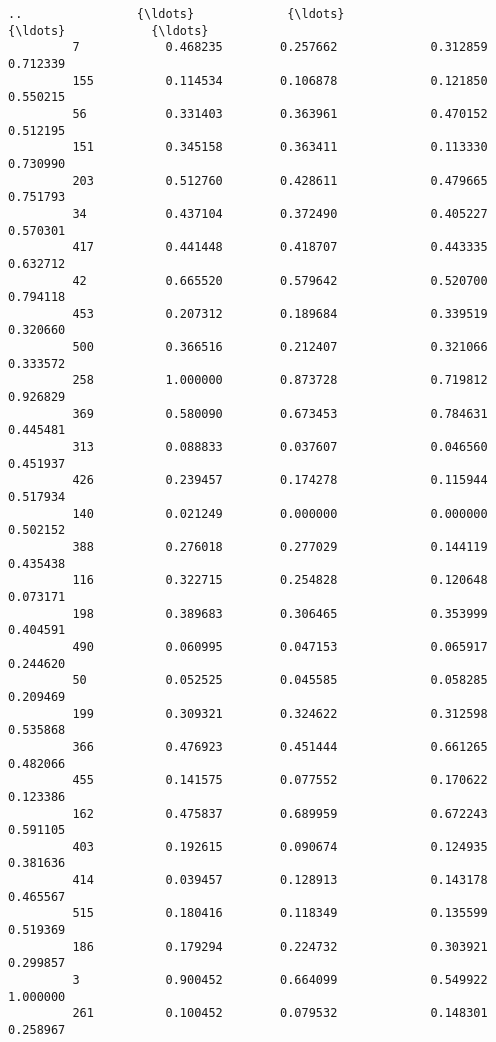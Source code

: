 \documentclass[11pt]{article}
\begin{document}
\begin{Verbatim}[commandchars=\\\{\}]
         ..                {\ldots}             {\ldots}                  {\ldots}            {\ldots}   
         7            0.468235        0.257662             0.312859       0.712339   
         155          0.114534        0.106878             0.121850       0.550215   
         56           0.331403        0.363961             0.470152       0.512195   
         151          0.345158        0.363411             0.113330       0.730990   
         203          0.512760        0.428611             0.479665       0.751793   
         34           0.437104        0.372490             0.405227       0.570301   
         417          0.441448        0.418707             0.443335       0.632712   
         42           0.665520        0.579642             0.520700       0.794118   
         453          0.207312        0.189684             0.339519       0.320660   
         500          0.366516        0.212407             0.321066       0.333572   
         258          1.000000        0.873728             0.719812       0.926829   
         369          0.580090        0.673453             0.784631       0.445481   
         313          0.088833        0.037607             0.046560       0.451937   
         426          0.239457        0.174278             0.115944       0.517934   
         140          0.021249        0.000000             0.000000       0.502152   
         388          0.276018        0.277029             0.144119       0.435438   
         116          0.322715        0.254828             0.120648       0.073171   
         198          0.389683        0.306465             0.353999       0.404591   
         490          0.060995        0.047153             0.065917       0.244620   
         50           0.052525        0.045585             0.058285       0.209469   
         199          0.309321        0.324622             0.312598       0.535868   
         366          0.476923        0.451444             0.661265       0.482066   
         455          0.141575        0.077552             0.170622       0.123386   
         162          0.475837        0.689959             0.672243       0.591105   
         403          0.192615        0.090674             0.124935       0.381636   
         414          0.039457        0.128913             0.143178       0.465567   
         515          0.180416        0.118349             0.135599       0.519369   
         186          0.179294        0.224732             0.303921       0.299857   
         3            0.900452        0.664099             0.549922       1.000000   
         261          0.100452        0.079532             0.148301       0.258967   
         

\end{Verbatim}
\end{document}

